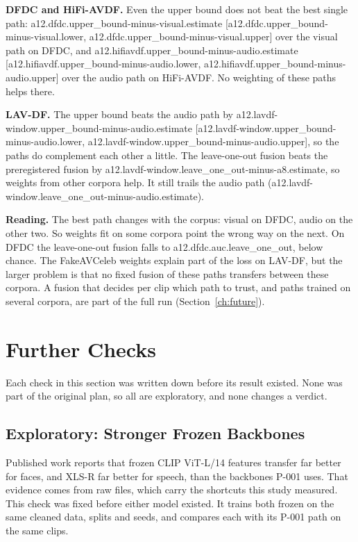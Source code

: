 \textbf{DFDC and HiFi-AVDF.} Even the upper bound does not beat the best
single path: {{a12.dfdc.upper_bound-minus-visual.estimate}}
[{{a12.dfdc.upper_bound-minus-visual.lower}},
{{a12.dfdc.upper_bound-minus-visual.upper}}] over the visual path on DFDC, and
{{a12.hifiavdf.upper_bound-minus-audio.estimate}}
[{{a12.hifiavdf.upper_bound-minus-audio.lower}},
{{a12.hifiavdf.upper_bound-minus-audio.upper}}] over the audio path on
HiFi-AVDF. No weighting of these paths helps there.

\textbf{LAV-DF.} The upper bound beats the audio path by
{{a12.lavdf-window.upper_bound-minus-audio.estimate}}
[{{a12.lavdf-window.upper_bound-minus-audio.lower}},
{{a12.lavdf-window.upper_bound-minus-audio.upper}}], so the paths do
complement each other a little. The leave-one-out fusion beats the preregistered fusion
by {{a12.lavdf-window.leave_one_out-minus-a8.estimate}}, so weights from other
corpora help. It still trails the audio path
({{a12.lavdf-window.leave_one_out-minus-audio.estimate}}).

\textbf{Reading.} The best path changes with the corpus: visual on DFDC, audio
on the other two. So weights fit on some corpora point the wrong way on the
next. On DFDC the leave-one-out fusion falls to {{a12.dfdc.auc.leave_one_out}},
below chance. The FakeAVCeleb weights explain part of the loss on LAV-DF, but
the larger problem is that no fixed fusion of these paths transfers between
these corpora. A fusion that decides per clip which path to trust, and paths
trained on several corpora, are part of the full run
(Section~\ref{ch:future}).

\section{Further Checks}
\label{sec:r-further}

Each check in this section was written down before its result existed. None
was part of the original plan, so all are exploratory, and none changes a
verdict.

\subsection{Exploratory: Stronger Frozen Backbones}
\label{sec:a11}

Published work reports that frozen CLIP ViT-L/14 features transfer far better
for faces, and XLS-R far better for speech, than the backbones P-001 uses. That
evidence comes from raw files, which carry the shortcuts this study measured.
This check was fixed before either model existed. It trains both frozen on
the same cleaned data, splits and seeds, and compares each with its P-001 path
on the same clips.

